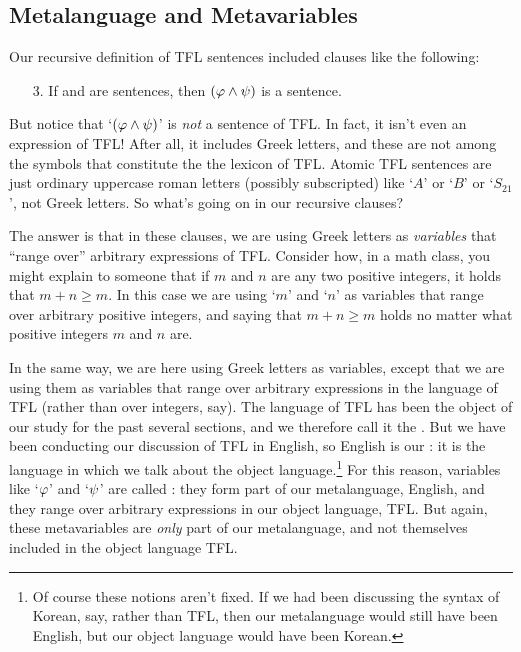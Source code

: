 \subsection{Metalanguage and Metavariables}\label{s:TFLMetavariables}

Our recursive definition of TFL sentences included clauses like the following:
\begin{enumerate}
\item[3.] If \meta{\varphi} and \meta{\psi} are sentences, then $(\mathcal{\varphi}\wedge\mathcal{\psi})$ is a sentence.
\end{enumerate}
But notice that `$(\mathcal{\varphi} \wedge \mathcal{\psi})$' is \emph{not} a sentence of TFL.  In fact, it isn't even an expression of TFL!  After all, it includes Greek letters, and these are not among the symbols that constitute the the lexicon of TFL.  Atomic TFL sentences are just ordinary uppercase roman letters (possibly subscripted) like `$A$' or `$B$' or `$S_{21}$', not Greek letters.  So what's going on in our recursive clauses?

The answer is that in these clauses, we are using Greek letters as \emph{variables} that ``range over'' arbitrary expressions of TFL.  Consider how, in a math class, you might explain to someone that if $m$ and $n$ are any two positive integers, it holds that $m + n \geq m$.  In this case we are using `$m$' and `$n$' as variables that range over arbitrary positive integers,  and saying that $m + n \geq m$ holds no matter what positive integers $m$  and $n$ are.  %

In the same way, we are here using Greek letters as variables, except that we are using them as variables that range over arbitrary expressions in the language of TFL (rather than over integers, say).  The language of TFL has been the object of our study for the past several sections, and we therefore call it the .  But we have been conducting our discussion of TFL in English, so English is our : it is the language in which we talk about the object language.\footnote{Of course these notions aren't fixed.  If we had been discussing the syntax of Korean, say, rather than TFL, then our metalanguage would still have been English, but our object language would have been Korean.}
For this reason, variables like `$\mathcal{\varphi}$' and `$\mathcal{\psi}$' are called : they form part of our metalanguage, English, and they range over arbitrary expressions in our object language, TFL.  But again, these metavariables are \emph{only} part of our metalanguage, and not themselves included in the object language TFL.


